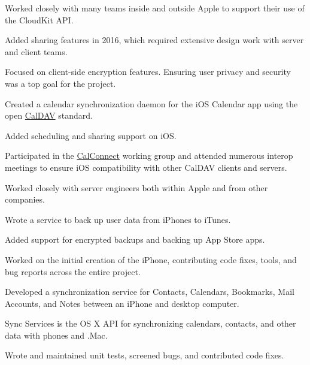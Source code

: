 \begin{cventries}
{\begin{cvsubentries}
{\begin{cvitems}
         		\item {Worked closely with many teams inside and outside Apple to support their use of the CloudKit API.}
         		\item {Added sharing features in 2016, which required extensive design work with server and client teams.}
			\item {Focused on client-side encryption features. Ensuring user privacy and security was a top goal for the project.}
         	 \end{cvitems}
        		}
       		{}%
		{
		\begin{cvitems}
         		\item {Created a calendar synchronization daemon for the iOS Calendar app using the open \href{https://tools.ietf.org/html/rfc4791}{CalDAV} standard.}
			\item {Added scheduling and sharing support on iOS.} 
         		\item {Participated in the \href{https://www.calconnect.org}{CalConnect} working group and attended numerous interop meetings to ensure iOS compatibility with other CalDAV clients and servers.}
			\item {Worked closely with server engineers both within Apple and from other companies.}
         	 \end{cvitems}
        		}
       		{}
		{
		\begin{cvitems}
         		\item {Wrote a service to back up user data from iPhones to iTunes.}
			\item {Added support for encrypted backups and backing up App Store apps.}
         	 \end{cvitems}
        		}
       		{}
		{
		\begin{cvitems}
			\item {Worked on the initial creation of the iPhone, contributing code fixes, tools, and bug reports across the entire project.}
         		\item {Developed a synchronization service for Contacts, Calendars, Bookmarks, Mail Accounts, and Notes between an iPhone and desktop computer.}
         	 \end{cvitems}
        		}
       		{Sync Services is the OS X API for synchronizing calendars, contacts, and other data with phones and .Mac.}
		{
		\begin{cvitems}
         		\item {Wrote and maintained unit tests, screened bugs, and contributed code fixes.}
         	 \end{cvitems}
        		}
      	\end{cvsubentries}
    }
\end{cventries}
